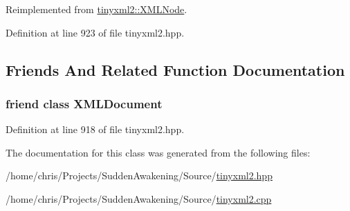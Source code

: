 Reimplemented from \hyperlink{classtinyxml2_1_1_x_m_l_node_aedae0bbb58d533a4b8a61042388b49e5}{tinyxml2\-::\-X\-M\-L\-Node}.



Definition at line 923 of file tinyxml2.\-hpp.



\subsection{Friends And Related Function Documentation}
\hypertarget{classtinyxml2_1_1_x_m_l_declaration_a4eee3bda60c60a30e4e8cd4ea91c4c6e}{
\subsubsection[{X\-M\-L\-Document}]{\setlength{\rightskip}{0pt plus 5cm}friend class {\bf X\-M\-L\-Document}\hspace{0.3cm}{\ttfamily [friend]}}}\label{classtinyxml2_1_1_x_m_l_declaration_a4eee3bda60c60a30e4e8cd4ea91c4c6e}


Definition at line 918 of file tinyxml2.\-hpp.



The documentation for this class was generated from the following files\-:\begin{DoxyCompactItemize}
\item 
/home/chris/\-Projects/\-Sudden\-Awakening/\-Source/\hyperlink{tinyxml2_8hpp}{tinyxml2.\-hpp}\item 
/home/chris/\-Projects/\-Sudden\-Awakening/\-Source/\hyperlink{tinyxml2_8cpp}{tinyxml2.\-cpp}\end{DoxyCompactItemize}
